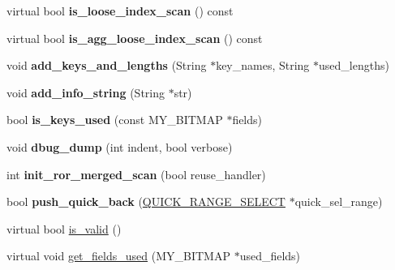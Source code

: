 \begin{DoxyCompactItemize}
\mbox{\label{classQUICK__ROR__INTERSECT__SELECT_a4881602b86d2233cda3daefd1acc3ada}} 
virtual bool {\bfseries is\+\_\+loose\+\_\+index\+\_\+scan} () const
\item 
\mbox{\label{classQUICK__ROR__INTERSECT__SELECT_a527c623fd8088b01037ff8172acb9ab4}} 
virtual bool {\bfseries is\+\_\+agg\+\_\+loose\+\_\+index\+\_\+scan} () const
\item 
\mbox{\label{classQUICK__ROR__INTERSECT__SELECT_af7466c94b8c58bb884ebdfe6ec26e5f8}} 
void {\bfseries add\+\_\+keys\+\_\+and\+\_\+lengths} (String $\ast$key\+\_\+names, String $\ast$used\+\_\+lengths)
\item 
\mbox{\label{classQUICK__ROR__INTERSECT__SELECT_a6597f5f6583d633948df0a0dd6bcbe7d}} 
void {\bfseries add\+\_\+info\+\_\+string} (String $\ast$str)
\item 
\mbox{\label{classQUICK__ROR__INTERSECT__SELECT_a5d8372364a5ad740f87b81f034e56874}} 
bool {\bfseries is\+\_\+keys\+\_\+used} (const M\+Y\+\_\+\+B\+I\+T\+M\+AP $\ast$fields)
\item 
\mbox{\label{classQUICK__ROR__INTERSECT__SELECT_a990d205a6e16f6bca1d5cb82a0e4539a}} 
void {\bfseries dbug\+\_\+dump} (int indent, bool verbose)
\item 
\mbox{\label{classQUICK__ROR__INTERSECT__SELECT_a7157adfcb78afeee92fffe2194f78b54}} 
int {\bfseries init\+\_\+ror\+\_\+merged\+\_\+scan} (bool reuse\+\_\+handler)
\item 
\mbox{\label{classQUICK__ROR__INTERSECT__SELECT_ac18fad365fd2fa88ccbc46f0ea75840a}} 
bool {\bfseries push\+\_\+quick\+\_\+back} (\mbox{\hyperlink{classQUICK__RANGE__SELECT}{Q\+U\+I\+C\+K\+\_\+\+R\+A\+N\+G\+E\+\_\+\+S\+E\+L\+E\+CT}} $\ast$quick\+\_\+sel\+\_\+range)
\item 
virtual bool \mbox{\hyperlink{classQUICK__ROR__INTERSECT__SELECT_a04eea20e0eba7ff80cd29290cee6c508}{is\+\_\+valid}} ()
\item 
virtual void \mbox{\hyperlink{classQUICK__ROR__INTERSECT__SELECT_a831ac1e06acc3fc3c270da55fcce5c65}{get\+\_\+fields\+\_\+used}} (M\+Y\+\_\+\+B\+I\+T\+M\+AP $\ast$used\+\_\+fields)
\end{DoxyCompactItemize}
